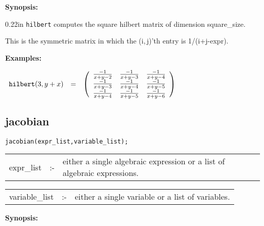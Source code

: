 {\bf Synopsis:} %

\begin{addtolength}{\leftskip}{0.22in}
{\tt hilbert} computes the square hilbert matrix of
                dimension square\_size.

This is the symmetric matrix in
                which the (i,$\,$j)'th entry is 1/(i+j-expr).

\end{addtolength}

{\bf Examples:}

\begin{flushleft}
\hspace*{0.1in}
\begin{math}
\begin{array}{ccc}
{\tt hilbert}(3,y+x) & = &
\left( \begin{array}{ccc} \frac{-1}{x+y-2} & \frac{-1}{x+y-3}
& \frac{-1}{x+y-4} \\ \frac{-1}{x+y-3} & \frac{-1}{x+y-4} &
\frac{-1}{x+y-5} \\ \frac{-1}{x+y-4} & \frac{-1}{x+y-5} &
\frac{-1}{x+y-6}
\end{array} \right)
\end{array}
\end{math}
\end{flushleft}


\subsection{jacobian}


\hspace*{0.175in} {\tt jacobian(expr\_list,variable\_list);}

\hspace*{0.1in}
\begin{tabular}{l l l}
expr\_list   \hspace*{0.175in}  &:-& \parbox[t]{.72\linewidth}{either a
single algebraic expression or a list of algebraic expressions.}
\end{tabular}

\vspace*{0.04in}
\hspace*{0.1in}
\begin{tabular}{l l l}
variable\_list &:-& either a single variable or a list of variables.
\end{tabular}

{\bf Synopsis:} %

